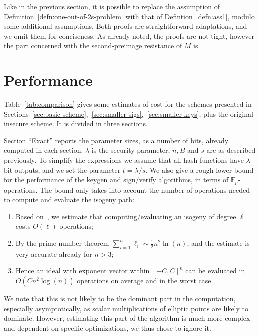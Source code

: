\documentclass{llncs}
\newcommand{\F}{\mathbb{F}}
\begin{document}
Like in the previous section, it is possible to replace the assumption of Definition~\ref{defn:one-out-of-2s-problem} with that of Defintion~\ref{defn:ass1}, modulo some additional assumptions.
Both proofs are straightforward adaptations, and we omit them for conciseness.
As already noted, the proofs are not tight, however the part concerned with the second-preimage resistance of $M$ is.


\section{Performance}


Table~\ref{tab:comparison} gives some estimates of cost for the schemes presented in Sections~\ref{sec:basic-scheme},~\ref{sec:smaller-sigs},~\ref{sec:smaller-keys}, plus the original insecure scheme.
It is divided in three sections.

Section ``Exact'' reports the parameter sizes, as a number of bits, already computed in each section.
$\lambda$ is the security parameter, $n,B$ and $s$ are as described previously.
To simplify the expressions we assume that all hash functions have $\lambda$-bit outputs, and we set the parameter $t=\lambda/s$.
We also give a rough lower bound for the performance of the keygen and sign/verify algorithms, in terms of $\F_p$-operations.
The bound only takes into account the number of operations needed to compute and evaluate the isogeny path:
\begin{enumerate}
\item Based
  on~\cite{10.1007/978-3-319-70697-9_11,10.1007/978-3-319-79063-3_11},
  we estimate that computing/evaluating an isogeny of degree $\ell$
  costs $O(\ell)$ operations;
\item By the prime number theorem $\sum_{i=1}^n\ell_i\sim\frac{1}{2}n^2\ln(n)$, and the estimate is very accurate already for $n>3$;
\item Hence an ideal with exponent vector within $[-C,C]^n$ can be evaluated in $O(Cn^2\log(n))$ operations on average and in the worst case.
\end{enumerate}
We note that this is not likely to be the dominant part in the computation, especially asymptotically,
as scalar multiplications of elliptic points are likely to dominate.
However, estimating this part of the algorithm is much more complex and dependent on specific optimizations, we thus chose to ignore it.
\end{document}
